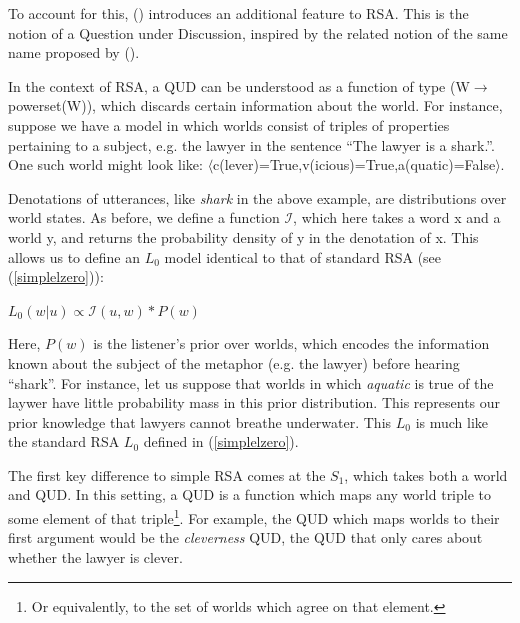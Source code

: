 \documentclass[10pt,letterpaper,twocolumn]{article}
\begin{document}
To account for this, (\cite{kao}) introduces an additional feature to RSA. This is the notion of a Question under Discussion, inspired by the related notion of the same name proposed by (\cite{roberts1996information}).

In the context of RSA, a QUD can be understood as a function of type (W$\to$powerset(W)), which discards certain information about the world. For instance, suppose we have a model in which worlds consist of triples of properties pertaining to a subject, e.g. the lawyer in the sentence ``The lawyer is a shark.''. One such world might look like: $\langle$c(lever)=True,v(icious)=True,a(quatic)=False$\rangle$. 

Denotations of utterances, like \emph{shark} in the above example, are distributions over world states. As before, we  define a function $\mathcal{I}$, which here takes a word x and a world y, and returns the probability density of y in the denotation of x. This allows us to define an $L_0$ model identical to that of standard RSA (see (\ref{simplelzero})):

\begin{exe}
\ex  $L_0(w\vert u) \propto  \mathcal{I}(u,w)*P(w)$
\end{exe}

Here, $P(w)$ is the listener's prior over worlds, which encodes the information known about the subject of the metaphor (e.g. the lawyer) before hearing ``shark''. For instance, let us suppose that worlds in which \emph{aquatic} is true of the laywer have little probability mass in this prior distribution. This represents our prior knowledge that lawyers cannot breathe underwater. This $L_0$ is much like the standard RSA $L_0$ defined in (\ref{simplelzero}).





The first key difference to simple RSA comes at the $S_1$, which takes both a world and QUD. In this setting, a QUD is a function which maps any world triple to some element of that triple\footnote{Or equivalently, to the set of worlds which agree on that element.}. For example, the QUD which maps worlds to their first argument would be the \emph{cleverness} QUD, the QUD that only cares about whether the lawyer is clever.
\end{document}
